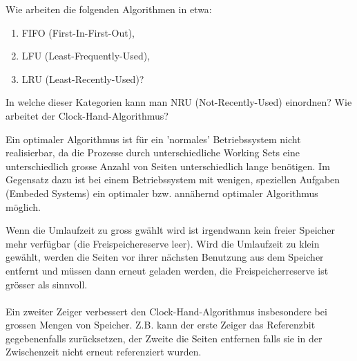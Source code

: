 \begin{multilinequestion}
Wie arbeiten die folgenden Algorithmen in etwa:
\begin{enumerate}
\item FIFO (First-In-First-Out),
\item LFU (Least-Frequently-Used),
\item LRU (Least-Recently-Used)?
\end{enumerate}
In welche dieser Kategorien kann man NRU (Not-Recently-Used) einordnen? Wie arbeitet
der Clock-Hand-Algorithmus?
\end{multilinequestion}

\begin{answer}
Ein optimaler Algorithmus ist für ein 'normales' Betriebssystem nicht realisierbar, da die Prozesse
durch unterschiedliche Working Sets eine unterschiedlich grosse Anzahl von Seiten unterschiedlich
lange benötigen.
Im Gegensatz dazu ist bei einem Betriebssystem mit wenigen, speziellen Aufgaben (Embeded
Systems) ein optimaler bzw. annähernd optimaler Algorithmus möglich.
\end{answer}

\begin{answer}
Wenn die Umlaufzeit zu gross gwählt wird ist irgendwann kein freier Speicher mehr verfügbar (die Freispeichereserve leer). Wird die Umlaufzeit zu klein gewählt, werden die Seiten vor ihrer nächsten Benutzung aus dem Speicher entfernt und müssen dann erneut geladen werden, die Freispeicherreserve ist grösser als sinnvoll.

\paragraph*{}
Ein zweiter Zeiger verbessert den Clock-Hand-Algorithmus insbesondere bei grossen Mengen von Speicher. Z.B. kann der erste Zeiger das Referenzbit gegebenenfalls zurücksetzen, der Zweite die
Seiten entfernen falls sie in der Zwischenzeit nicht erneut referenziert wurden.
\end{answer}

